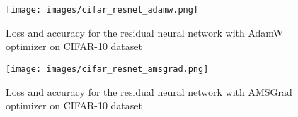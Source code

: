 \documentclass{article} %
\begin{document}
\begin{figure}[h]
\begin{center}
\texttt{[image: images/cifar\_resnet\_adamw.png]}
\end{center}
\caption{Loss and accuracy for the residual neural network with AdamW optimizer on CIFAR-10 dataset}
\end{figure}

\begin{figure}[h]
\begin{center}
\texttt{[image: images/cifar\_resnet\_amsgrad.png]}
\end{center}
\caption{Loss and accuracy for the residual neural network with AMSGrad optimizer on CIFAR-10 dataset}
\end{figure}
\end{document}
